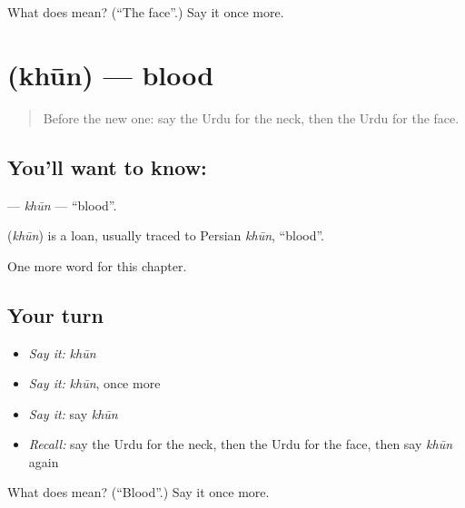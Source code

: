 \begin{tcolorbox}[breakable,colback=teal!4,colframe=teal!35!black,title={Before you move on}]
What does  mean? (\textquotedblleft{}The face\textquotedblright{}.) Say it once more.
\end{tcolorbox}
\section[\texorpdfstring{\ur{خون} (khūn)}{خون (khūn)}]{ (khūn) — blood}

\label{lesson:UR-C40-khun}



\begin{quote}
Before the new one: say the Urdu for the neck, then the Urdu for the face.
\end{quote}

\subsection*{You'll want to know: }
\textbf{} — \emph{khūn} — \textquotedblleft{}blood\textquotedblright{}.

\begin{cousinweb}
\textbf{} (\emph{khūn}) is a loan, usually traced to Persian \emph{khūn}, \textquotedblleft{}blood\textquotedblright{}.
\end{cousinweb}

\begin{grammarlens}[title={What you've built}]
One more word for this chapter.
\end{grammarlens}

\subsection*{Your turn}
\begin{itemize}
\raggedright
  \item \emph{Say it:} \emph{khūn}
  \item \emph{Say it:} \emph{khūn}, once more
  \item \emph{Say it:} say \emph{khūn}
  \item \emph{Recall:} say the Urdu for the neck, then the Urdu for the face, then say \emph{khūn} again
\end{itemize}

\begin{tcolorbox}[breakable,colback=teal!4,colframe=teal!35!black,title={Before you move on}]
What does  mean? (\textquotedblleft{}Blood\textquotedblright{}.) Say it once more.
\end{tcolorbox}
